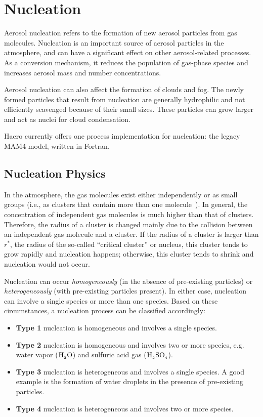 \section{Nucleation}

Aerosol nucleation refers to the formation of new aerosol particles from gas
molecules. Nucleation is an important source of aerosol particles in the
atmosphere, and can have a significant effect on other aerosol-related
processes. As a conversion mechanism, it reduces the population of gas-phase
species and increases aerosol mass and number concentrations.

Aerosol nucleation can also affect the formation of clouds and fog. The newly
formed particles that result from nucleation are generally hydrophilic and not
efficiently scavenged because of their small sizes. These particles can
grow larger and act as nuclei for cloud condensation.

Haero currently offers one process implementation for nucleation: the legacy
MAM4 model, written in Fortran.

\subsection{Nucleation Physics}

In the atmosphere, the gas molecules exist either independently or as small
groups (i.e., as clusters that contain more than one molecule~\cite{seinfeld-2006-acp}).
In general, the concentration of independent gas molecules is much higher than
that of clusters. Therefore, the radius of a cluster is changed mainly due to the collision
between an independent gas molecule and a cluster. If the radius of a cluster is larger
than $r^*$, the radius of the so-called ``critical cluster'' or nucleus, this cluster tends to
grow rapidly and nucleation happens; otherwise, this cluster tends to shrink and nucleation
would not occur.

Nucleation can occur {\em homogeneously} (in the absence of pre-existing
particles) or {\em heterogeneously} (with pre-existing particles present).
In either case, nucleation can involve a single species or more than one species.
Based on these circumstances, a nucleation process can be classified
accordingly:

\begin{itemize}
  \item {\bf Type 1} nucleation is homogeneous and involves a single species.
  \item {\bf Type 2} nucleation is homogeneous and involves two or more species,
        e.g. water vapor ($\rm H_{_2}O$) and sulfuric acid gas ($\rm H_{_2}SO_{_4}$).
  \item {\bf Type 3} nucleation is heterogeneous and involves a single species.
        A good example is the formation of water droplets in the presence of
        pre-existing particles.
  \item {\bf Type 4} nucleation is heterogeneous and involves two or more
        species.
\end{itemize}

